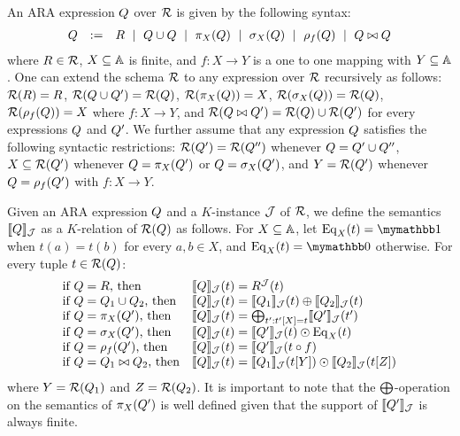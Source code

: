 An ARA expression $Q$ over $\mathcal{R}$ is given by the following syntax:
$$
\begin{array}{rcl}
Q & := & R \ \mid \ Q \cup Q \ \mid \  \pi_X(Q) \ \mid \  \sigma_X(Q) \ \mid \ \rho_f(Q) \ \mid \ Q \bowtie Q
\end{array}
$$
where $R \in \mathcal{R}$, $X \subseteq \mathbb{A}$ is finite, and $f: X \rightarrow Y$ is a one to one mapping with $Y \subseteq \mathbb{A}$. One can extend the schema $\mathcal{R}$ to any expression over $\mathcal{R}$ recursively as follows: $\mathcal{R}(R) = R$, $\mathcal{R}(Q \cup Q') = \mathcal{R}(Q)$, $\mathcal{R}(\pi_X(Q)) = X$, $\mathcal{R}(\sigma_X(Q)) = \mathcal{R}(Q)$, $\mathcal{R}(\rho_f(Q)) = X$ where $f:X \rightarrow Y$, and $\mathcal{R}(Q \bowtie Q') = \mathcal{R}(Q) \cup \mathcal{R}(Q')$ for every expressions $Q$ and $Q'$.
We further assume that any expression $Q$ satisfies the following syntactic restrictions: $\mathcal{R}(Q') = \mathcal{R}(Q'')$ whenever $Q = Q' \cup Q''$, $X \subseteq \mathcal{R}(Q')$ whenever $Q = \pi_X(Q')$ or $Q = \sigma_X(Q')$, and $Y = \mathcal{R}(Q')$ whenever $Q = \rho_f(Q')$ with $f: X \rightarrow Y$.

Given an ARA expression $Q$ and a $K$-instance $\mathcal{J}$ of $\mathcal{R}$, we define the semantics $\llbracket Q \rrbracket_{\mathcal{J}}$ as a $K$-relation of $\mathcal{R}(Q)$ as follows. For $X \subseteq \mathbb{A}$, let $\operatorname{Eq}_X(t) = \kone$ when $t(a) = t(b)$ for every $a, b \in X$, and $\operatorname{Eq}_X(t) = \kzero$ otherwise. For every tuple $t \in \mathcal{R}(Q)$:
$$
\begin{array}{ll}
\text{if $Q = R$, then} & \llbracket Q \rrbracket_{\mathcal{J}}(t) = R^{\mathcal{J}}(t) \\
\text{if $Q = Q_1 \cup Q_2$, then} & \llbracket Q \rrbracket_{\mathcal{J}}(t) = \llbracket Q_1 \rrbracket_{\mathcal{J}}(t) \oplus \llbracket Q_2 \rrbracket_{\mathcal{J}}(t)  \\
\text{if $Q = \pi_X(Q')$, then} & \llbracket Q \rrbracket_{\mathcal{J}}(t) = \bigoplus_{t': t'[X] = t} \llbracket Q' \rrbracket_{\mathcal{J}}(t') \\
\text{if $Q = \sigma_X(Q')$, then} & \llbracket Q \rrbracket_{\mathcal{J}}(t) = 
\llbracket Q' \rrbracket_{\mathcal{J}}(t) \odot \operatorname{Eq}_X(t)  \\
\text{if $Q = \rho_f(Q')$, then} & \llbracket Q \rrbracket_{\mathcal{J}}(t) = 
\llbracket Q' \rrbracket_{\mathcal{J}}(t \circ f)  
\\
\text{if $Q = Q_1 \bowtie Q_2$, then} & \llbracket Q \rrbracket_{\mathcal{J}}(t) =  \llbracket Q_1 \rrbracket_{\mathcal{J}}(t[Y]) \odot  \llbracket Q_2 \rrbracket_{\mathcal{J}}(t[Z])
\end{array}
$$
where $Y = \mathcal{R}(Q_1)$ and $Z = \mathcal{R}(Q_2)$. It is important to note that the $\bigoplus$-operation on the semantics of $\pi_X(Q')$ is well defined given that the support of $\llbracket Q' \rrbracket_{\mathcal{J}}$ is always finite. 

